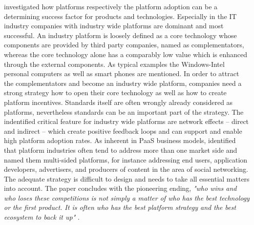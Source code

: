 \citet{Cusumano2010} investigated how platforms respectively the platform adoption can be a determining success factor for products and technologies. Especially in the \ac{IT} industry companies with industry wide platforms are dominant and most successful. An industry platform is loosely defined as a core technology whose components are provided by third party companies, named as complementators, whereas the core technology alone has a comparably low value which is enhanced through the external components. As typical examples the Windows-Intel personal computers as well as smart phones are mentioned. In order to attract the complementators and become an industry wide platform, companies need a strong strategy how to open their core technology as well as how to create platform incentives. Standards itself are often wrongly already considered as platforms, nevertheless standards can be an important part of the strategy. The indentified critical feature for industry wide platforms are network effects -- direct and indirect -- which create positive feedback loops and can support and enable high platform adoption rates. As inherent in \ac{PaaS} business models, \citet{Cusumano2010} identified that platform industries often tend to address more than one market side and named them multi-sided platforms, for instance addressing end users, application developers, advertisers, and producers of content in the area of social networking. The adequate strategy is difficult to design and needs to take all essential matters into account. The paper concludes with the pioneering ending, \textit{"who wins and who loses these competitions is not simply a matter of who has the best technology or the first product. It is often who has the best platform strategy and the best ecosystem to back it up"} \citep[p. 34]{Cusumano2010}.

